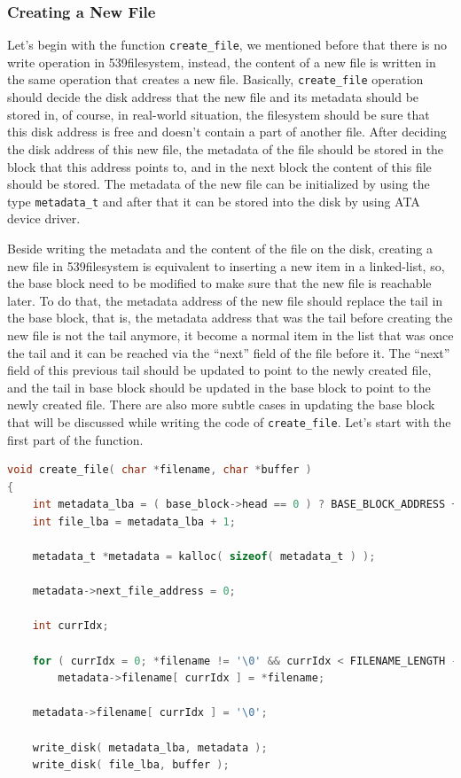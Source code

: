 \subsubsection{Creating a New File}\label{creating-a-new-file}

Let's begin with the function \lstinline!create_file!, we mentioned
before that there is no write operation in 539filesystem, instead, the
content of a new file is written in the same operation that creates a
new file. Basically, \lstinline!create_file! operation should decide the
disk address that the new file and its metadata should be stored in, of
course, in real-world situation, the filesystem should be sure that this
disk address is free and doesn't contain a part of another file. After
deciding the disk address of this new file, the metadata of the file
should be stored in the block that this address points to, and in the
next block the content of this file should be stored. The metadata of
the new file can be initialized by using the type \lstinline!metadata_t!
and after that it can be stored into the disk by using ATA device
driver.

Beside writing the metadata and the content of the file on the disk,
creating a new file in 539filesystem is equivalent to inserting a new
item in a linked-list, so, the base block need to be modified to make
sure that the new file is reachable later. To do that, the metadata
address of the new file should replace the tail in the base block, that
is, the metadata address that was the tail before creating the new file
is not the tail anymore, it become a normal item in the list that was
once the tail and it can be reached via the ``next'' field of the file
before it. The ``next'' field of this previous tail should be updated to
point to the newly created file, and the tail in base block should be
updated in the base block to point to the newly created file. There are
also more subtle cases in updating the base block that will be discussed
while writing the code of \lstinline!create_file!. Let's start with the
first part of the function.

\begin{lstlisting}[language=C]
void create_file( char *filename, char *buffer )
{
    int metadata_lba = ( base_block->head == 0 ) ? BASE_BLOCK_ADDRESS + 1 : base_block->tail + 2;
    int file_lba = metadata_lba + 1;
    
    metadata_t *metadata = kalloc( sizeof( metadata_t ) );
    
    metadata->next_file_address = 0;
    
    int currIdx;
    
    for ( currIdx = 0; *filename != '\0' && currIdx < FILENAME_LENGTH - 1; currIdx++, filename++ )
        metadata->filename[ currIdx ] = *filename;
    
    metadata->filename[ currIdx ] = '\0';
    
    write_disk( metadata_lba, metadata );
    write_disk( file_lba, buffer );
\end{lstlisting}

